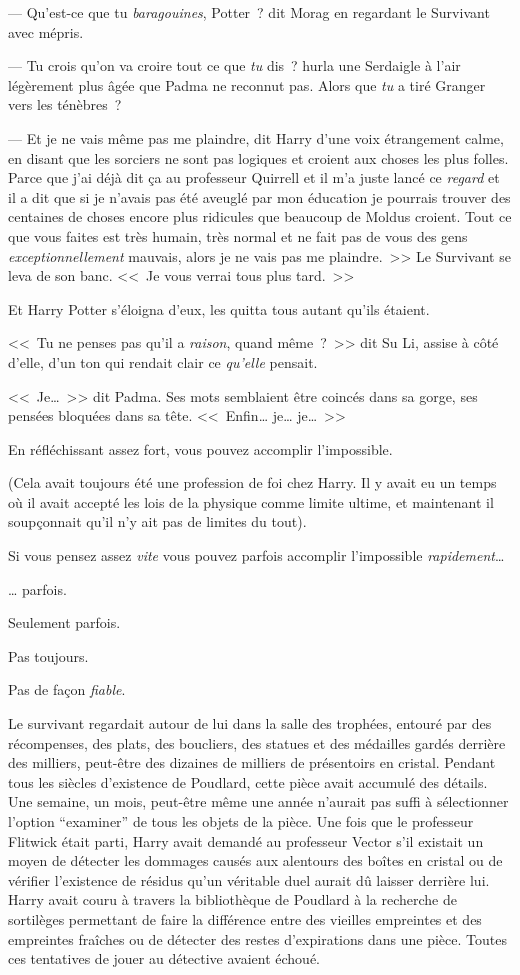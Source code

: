 --- Qu'est-ce que tu \emph{baragouines}, Potter~? dit Morag en regardant le Survivant avec mépris.

--- Tu crois qu'on va croire tout ce que \emph{tu} dis~? hurla une Serdaigle à l'air légèrement plus âgée que Padma ne reconnut pas. Alors que \emph{tu} a tiré Granger vers les ténèbres~?

--- Et je ne vais même pas me plaindre, dit Harry d'une voix étrangement calme, en disant que les sorciers ne sont pas logiques et croient aux choses les plus folles. Parce que j'ai déjà dit ça au professeur Quirrell et il m'a juste lancé ce \emph{regard} et il a dit que si je n'avais pas été aveuglé par mon éducation je pourrais trouver des centaines de choses encore plus ridicules que beaucoup de Moldus croient. Tout ce que vous faites est très humain, très normal et ne fait pas de vous des gens \emph{exceptionnellement} mauvais, alors je ne vais pas me plaindre.~>> Le Survivant se leva de son banc. <<~Je vous verrai tous plus tard.~>>

Et Harry Potter s'éloigna d'eux, les quitta tous autant qu'ils étaient.

<<~Tu ne penses pas qu'il a \emph{raison}, quand même~?~>> dit Su Li, assise à côté d'elle, d'un ton qui rendait clair ce \emph{qu'elle} pensait.

<<~Je…~>> dit Padma. Ses mots semblaient être coincés dans sa gorge, ses pensées bloquées dans sa tête. <<~Enfin… je… je…~>>

\later

En réfléchissant assez fort, vous pouvez accomplir l'impossible.

(Cela avait toujours été une profession de foi chez Harry. Il y avait eu un temps où il avait accepté les lois de la physique comme limite ultime, et maintenant il soupçonnait qu'il n'y ait pas de limites du tout).

Si vous pensez assez \emph{vite} vous pouvez parfois accomplir l'impossible \emph{rapidement}…

… parfois.

Seulement parfois.

Pas toujours.

Pas de façon \emph{fiable}.

Le survivant regardait autour de lui dans la salle des trophées, entouré par des récompenses, des plats, des boucliers, des statues et des médailles gardés derrière des milliers, peut-être des dizaines de milliers de présentoirs en cristal. Pendant tous les siècles d'existence de Poudlard, cette pièce avait accumulé des détails. Une semaine, un mois, peut-être même une année n'aurait pas suffi à sélectionner l'option “examiner” de tous les objets de la pièce. Une fois que le professeur Flitwick était parti, Harry avait demandé au professeur Vector s'il existait un moyen de détecter les dommages causés aux alentours des boîtes en cristal ou de vérifier l'existence de résidus qu'un véritable duel aurait dû laisser derrière lui. Harry avait couru à travers la bibliothèque de Poudlard à la recherche de sortilèges permettant de faire la différence entre des vieilles empreintes et des empreintes fraîches ou de détecter des restes d'expirations dans une pièce. Toutes ces tentatives de jouer au détective avaient échoué.

